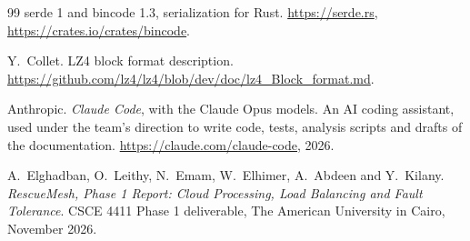 \documentclass[10pt,a4paper]{article}
\begin{document}
\begin{thebibliography}{99}
 serde 1 and bincode 1.3, serialization for Rust. \url{https://serde.rs}, \url{https://crates.io/crates/bincode}.

 Y.~Collet. LZ4 block format description. \url{https://github.com/lz4/lz4/blob/dev/doc/lz4_Block_format.md}.

 Anthropic. \emph{Claude Code}, with the Claude Opus models. An AI coding assistant, used under the team's direction to write code, tests, analysis scripts and drafts of the documentation. \url{https://claude.com/claude-code}, 2026.

 A.~Elghadban, O.~Leithy, N.~Emam, W.~Elhimer, A.~Abdeen and Y.~Kilany. \emph{RescueMesh, Phase 1 Report: Cloud Processing, Load Balancing and Fault Tolerance}. CSCE 4411 Phase 1 deliverable, The American University in Cairo, November 2026.


\end{thebibliography}
\end{document}
